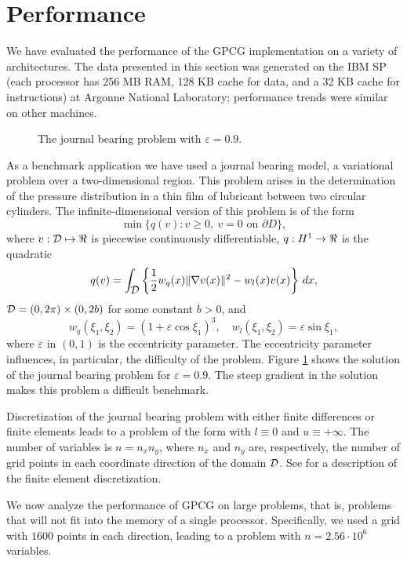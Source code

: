 
\section{Performance}

\label{sec:performance}

We have evaluated the performance of the GPCG implementation
on a variety of architectures.
The data presented in this section 
was generated on the IBM SP
(each processor has 256 MB RAM, 128 KB cache
for data, and a 32 KB cache for instructions)
at Argonne National Laboratory; performance trends
were similar on other machines.

\begin{figure} 
\centerline{}
\caption{The journal bearing problem with $ \varepsilon = 0.9 $.\label{pjb}}
\end{figure}

As a benchmark application we have used a journal bearing model,
a variational problem over a two-dimensional region.
This problem arises in the determination of the
pressure distribution in a thin film of lubricant
between two circular cylinders.
The infinite-dimensional version of this problem is
of the form
\[
\min \{ q ( v ) : v \ge 0 , \ v = 0 \mbox{ on } \partial D \} ,
\]
where $ v : \cD \mapsto \R $ is piecewise continuously differentiable,
$ q : H^1 \to \mbox{${\Re}$} $ is the quadratic 
\[
q (v) =
 \int_{ \cD } \left \{ \half  w_q (x) \| \grad v (x) \| ^ 2  -
  w_l (x) v (x) \right \} \, d x , 
\]
$ \cD = ( 0 , 2 \pi ) \times ( 0 , 2b ) $ for some constant $ b > 0 $,
and
\[
 w_q ( \xi_1 , \xi_2 ) = ( 1 + \varepsilon \cos \xi_1 ) ^ 3 , \quad
 w_l ( \xi_1 , \xi_2 ) = \varepsilon \sin \xi_1 ,
\]
where $ \varepsilon $ in $ (0,1) $ is the eccentricity parameter.
The eccentricity parameter
influences, in particular, the difficulty of the problem.
Figure \ref{pjb} shows the solution of the journal bearing problem
for $ \varepsilon = 0.9 $. The steep gradient in the solution
makes this problem a difficult benchmark.

Discretization of the journal bearing problem with either finite differences or
finite elements leads to a problem of the form  with
$ l \equiv 0 $ and $ u \equiv + \infty $.
The number of variables is $ n = n_x n_y $, where
$ n_x $ and $ n_y $ are, respectively, the number of
grid points in each coordinate direction of the domain $ \cD $.
See \cite{more-toraldo} for a description of the
finite element discretization.

We now analyze the performance of GPCG on large problems,
that is, problems that will not fit into the memory of a
single processor. Specifically,
we used a grid with 
$1600$ points in each direction, leading to a problem with
$ n = 2.56 \cdot 10^6 $ variables.


